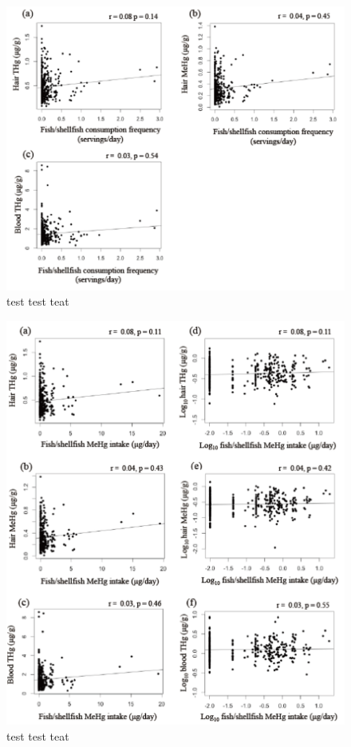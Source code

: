 \begin{figure}
  \centering
    \label{fig:Fig212}
  \includegraphics[scale=1]{Figures/Fig212.pdf}
  \caption[test caption]{test test teat}
\end{figure}

\begin{figure}
  \centering
    \label{fig:Fig213}
  \includegraphics[scale=1]{Figures/Fig213.pdf}
  \caption[test caption]{test test teat}
\end{figure}

